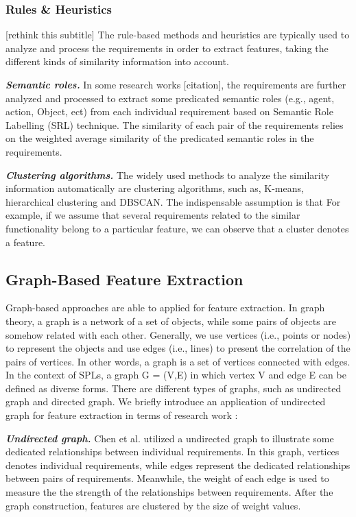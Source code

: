 \documentclass[graybox]{svmult}
\newcommand{\todo}[1]{{\color{red} [#1]}}
\begin{document}
\subsubsection{Rules \& Heuristics}
\todo{rethink this subtitle}
The rule-based methods and heuristics are typically used to analyze and process the requirements in order to extract features, taking the different kinds of similarity information into account.

\textit{\textbf{Semantic roles.}} 
In some research works \todo{citation}\cite{ItzikR14,ReinhartzIW14}, the requirements are further analyzed and processed to extract some predicated semantic roles (e.g., agent, action, Object, ect) from each individual requirement based on Semantic Role Labelling (SRL) technique. The similarity of each pair of the requirements relies on the weighted average similarity of the predicated semantic roles in the requirements.

\textit{\textbf{Clustering algorithms.}}
The widely used methods to analyze the similarity information automatically are clustering algorithms, such as, K-means, hierarchical clustering and DBSCAN. The indispensable assumption is that For example, if we assume that several requirements related to the similar functionality belong to a particular feature, we can observe that a cluster denotes a feature.

\subsection{Graph-Based Feature Extraction}


Graph-based approaches are able to applied for feature extraction. In graph theory, a graph is a network of a set of objects, while some pairs of objects are somehow related with each other. Generally, we use vertices (i.e., points or nodes) to represent the objects and use edges (i.e., lines) to present the correlation of the pairs of vertices. In other words, a graph is a set of vertices connected with edges. In the context of SPLs, a graph G = (V,E) in which vertex V and edge E can be defined as diverse forms. There are different types of graphs, such as undirected graph and directed graph. We briefly introduce an application of undirected graph for feature extraction in terms of research work \cite{ChenZZM05}:

\textit{\textbf{Undirected graph.}} Chen et al. utilized a undirected graph to illustrate some dedicated relationships between individual requirements. In this graph, vertices denotes individual requirements, while edges represent the dedicated relationships between pairs of requirements. Meanwhile, the weight of each edge is used to measure the the strength of the relationships between requirements. After the graph construction, features are clustered by the size of weight values.
\end{document}
